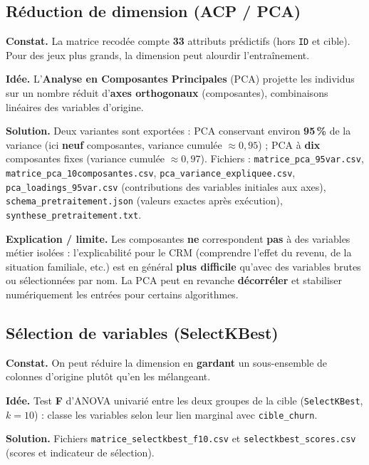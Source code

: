 \documentclass[11pt,a4paper]{article}
\begin{document}
\subsection{Réduction de dimension (ACP / PCA)}

\textbf{Constat.} La matrice recodée compte \textbf{33} attributs prédictifs (hors \texttt{ID} et cible). Pour des jeux plus grands, la dimension peut alourdir l'entraînement.

\textbf{Idée.} L'\textbf{Analyse en Composantes Principales} (PCA) projette les individus sur un nombre réduit d'\textbf{axes orthogonaux} (composantes), combinaisons linéaires des variables d'origine.

\textbf{Solution.} Deux variantes sont exportées : PCA conservant environ \textbf{95\,\%} de la variance (ici \textbf{neuf} composantes, variance cumulée $\approx 0{,}95$) ; PCA à \textbf{dix} composantes fixes (variance cumulée $\approx 0{,}97$). Fichiers : \texttt{matrice\_pca\_95var.csv}, \texttt{matrice\_pca\_10composantes.csv}, \texttt{pca\_variance\_expliquee.csv}, \texttt{pca\_loadings\_95var.csv} (contributions des variables initiales aux axes), \texttt{schema\_pretraitement.json} (valeurs exactes après exécution), \texttt{synthese\_pretraitement.txt}.

\textbf{Explication / limite.} Les composantes \textbf{ne} correspondent \textbf{pas} à des variables métier isolées : l'explicabilité pour le CRM (comprendre l'effet du revenu, de la situation familiale, etc.) est en général \textbf{plus difficile} qu'avec des variables brutes ou sélectionnées par nom. La PCA peut en revanche \textbf{décorréler} et stabiliser numériquement les entrées pour certains algorithmes.

\subsection{Sélection de variables (SelectKBest)}

\textbf{Constat.} On peut réduire la dimension en \textbf{gardant} un sous-ensemble de colonnes d'origine plutôt qu'en les mélangeant.

\textbf{Idée.} Test \textbf{F} d'ANOVA univarié entre les deux groupes de la cible (\texttt{SelectKBest}, $k=10$) : classe les variables selon leur lien marginal avec \texttt{cible\_churn}.

\textbf{Solution.} Fichiers \texttt{matrice\_selectkbest\_f10.csv} et \texttt{selectkbest\_scores.csv} (scores et indicateur de sélection).
\end{document}
